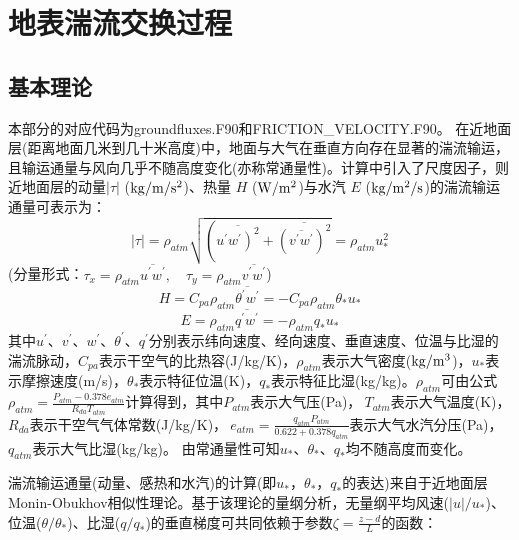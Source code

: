 \chapter{地表湍流交换过程}

\section{基本理论}\label{基本理论}
本部分的对应代码为groundfluxes.F90和FRICTION_VELOCITY.F90。
在近地面层(距离地面几米到几十米高度)中，地面与大气在垂直方向存在显著的湍流输运，且输运通量与风向几乎不随高度变化(亦称常通量性)。计算中引入了尺度因子，则近地面层的动量$\left|\tau\right|$ ($\rm kg/m/s^2$)、热量 $H$ ($\rm W/m^2$)与水汽 $E$ ($\rm kg/m^2/s$)的湍流输运通量可表示为：
\begin{equation}
|\tau|=\rho_{atm} \sqrt{\left(\overline{\left.u^{\prime} w^{\prime}\right)^{2}}+\overline{\left(\overline{v^{\prime} w^{\prime}}\right)^{2}}\right.}=\rho_{atm} u_{*}^{2}
\end{equation}
(分量形式：$\tau_{x}=\rho_{atm} \overline{u^{\prime} w^{\prime}}, \quad \tau_{y}=\rho_{atm} \overline{v^{\prime} w^{\prime}}$)
\begin{equation}
H=C_{p a} \rho_{atm} \overline{\theta^{\prime} w^{\prime}}=-C_{p a} \rho_{atm} \theta_{*} u_{*}
\end{equation}
\begin{equation}
E=\rho_{atm} \overline{q^{\prime} w^{\prime}}=-\rho_{atm} q_{*} u_{*}
\end{equation}
其中$u^\prime$、$v^\prime$、$w^\prime$、$\theta^\prime$、$q^\prime$分别表示纬向速度、经向速度、垂直速度、位温与比湿的湍流脉动，$C_{pa}$表示干空气的比热容(J/kg/K)，$\rho_{atm}$表示大气密度($\rm kg/m^3$)，$u_\ast$表示摩擦速度(m/s)，$\theta_\ast$表示特征位温(K)，$q_\ast$表示特征比湿(kg/kg)。$\rho_{atm}$可由公式$\rho_{atm}=\frac{P_{atm}-0.378e_{atm}}{R_{da}T_{atm}}$计算得到，其中$P_{atm}$表示大气压(Pa)，$\ T_{atm}$表示大气温度(K)，$R_{da}$表示干空气气体常数(J/kg/K)，$\ e_{atm}=\frac{q_{atm}P_{atm}}{0.622+0.378q_{atm}}$表示大气水汽分压(Pa)，$q_{atm}$表示大气比湿(kg/kg)。
由常通量性可知$u_\ast$、$\theta_\ast$、$q_\ast$均不随高度而变化。


湍流输运通量(动量、感热和水汽)的计算(即$u_\ast$，$\theta_\ast$，$q_\ast$的表达)来自于近地面层Monin-Obukhov相似性理论。基于该理论的量纲分析，无量纲平均风速($\left|u\right|/u_\ast$)、位温($\theta/\theta_\ast$)、比湿($q/q_\ast$)的垂直梯度可共同依赖于参数$\zeta=\frac{z-d}{L}$的函数：

